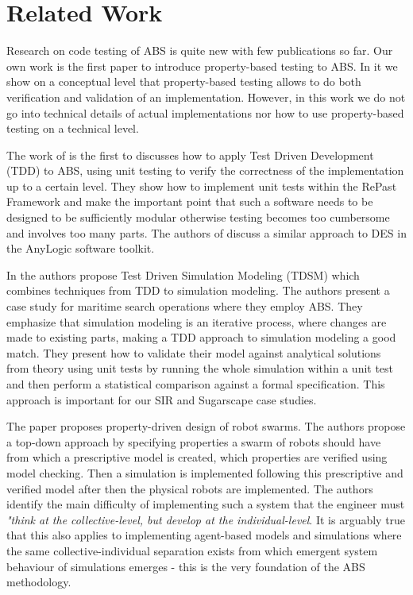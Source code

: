 \section{Related Work}
\label{sec:related}

Research on code testing of ABS is quite new with few publications so far. Our own work \cite{thaler_show_2019} is the first paper to introduce property-based testing to ABS. In it we show on a conceptual level that property-based testing allows to do both verification and validation of an implementation. However, in this work we do not go into technical details of actual implementations nor how to use property-based testing on a technical level.

The work of \cite{collier_test-driven_2013} is the first to discusses how to apply Test Driven Development (TDD) to ABS, using unit testing \cite{beck_test_2002} to verify the correctness of the implementation up to a certain level. They show how to implement unit tests within the RePast Framework  and make the important point that such a software needs to be designed to be sufficiently modular otherwise testing becomes too cumbersome and involves too many parts. The authors of \cite{asta_investigation_2014} discuss a similar approach to DES in the AnyLogic software toolkit. 

In \cite{onggo_test-driven_2016} the authors propose Test Driven Simulation Modeling (TDSM) which combines techniques from TDD to simulation modeling. The authors present a case study for maritime search operations where they employ ABS. They emphasize that simulation modeling is an iterative process, where changes are made to existing parts, making a TDD approach to simulation modeling a good match. They present how to validate their model against analytical solutions from theory using unit tests by running the whole simulation within a unit test and then perform a statistical comparison against a formal specification. This approach is important for our SIR and Sugarscape case studies.

The paper \cite{brambilla_property-driven_2012} proposes property-driven design of robot swarms. The authors propose a top-down approach by specifying properties a swarm of robots should have from which a prescriptive model is created, which properties are verified using model checking. Then a simulation is implemented following this prescriptive and verified model after then the physical robots are implemented. The authors identify the main difficulty of implementing such a system that the engineer must \textit{"think at the collective-level, but develop at the individual-level}. It is arguably true that this also applies to implementing agent-based models and simulations where the same collective-individual separation exists from which emergent system behaviour of simulations emerges - this is the very foundation of the ABS methodology.

